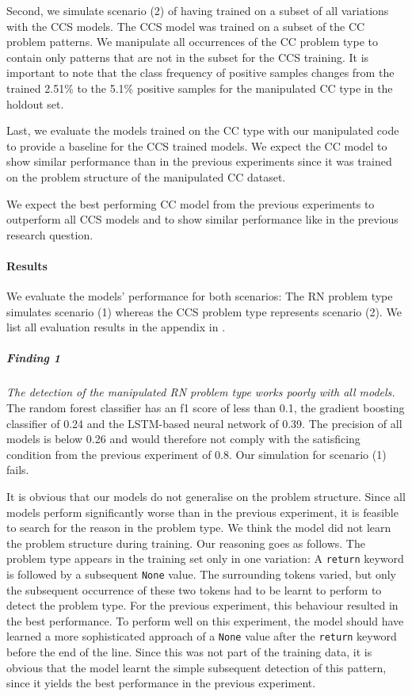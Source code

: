Second, we simulate scenario (2) of having trained on a subset of all variations with the CCS models. The CCS model was trained on a subset of the CC problem patterns. We manipulate all occurrences of the CC problem type to contain only patterns that are not in the subset for the CCS training. It is important to note that the class frequency of positive samples changes from the trained 2.51\% to the 5.1\% positive samples for the manipulated CC type in the holdout set.

Last, we evaluate the models trained on the CC type with our manipulated code to provide a baseline for the CCS trained models. We expect the CC model to show similar performance than in the previous experiments since it was trained on the problem structure of the manipulated CC dataset.

We expect the best performing CC model from the previous experiments to outperform all CCS models and to show similar performance like in the previous research question. 

\paragraph{Results}
We evaluate the models' performance for both scenarios: The RN problem type simulates scenario (1) whereas the CCS problem type represents scenario (2). We list all evaluation results in the appendix in .

\subparagraph{Finding 1}\label{finding:return_none_manipulated_bad}
\textit{The detection of the manipulated RN problem type works poorly with all models.} The random forest classifier has an f1 score of less than 0.1, the gradient boosting classifier of 0.24 and the LSTM-based neural network of 0.39. The precision of all models is below 0.26 and would therefore not comply with the satisficing condition from the previous experiment of 0.8. Our simulation for scenario (1) fails.

It is obvious that our models do not generalise on the problem structure.  Since all models perform significantly worse than in the previous experiment, it is feasible to search for the reason in the problem type.  We think the model did not learn the problem structure during training. Our reasoning goes as follows.
The problem type appears in the training set only in one variation: A \texttt{return} keyword is followed by a subsequent \texttt{None} value. The surrounding tokens varied, but only the subsequent occurrence of these two tokens had to be learnt to perform to detect the problem type. For the previous experiment, this behaviour resulted in the best performance. To perform well on this experiment, the model should have learned a more sophisticated approach of a \texttt{None} value after the \texttt{return} keyword before the end of the line. Since this was not part of the training data, it is obvious that the model learnt the simple subsequent detection of this pattern, since it yields the best performance in the previous experiment.


